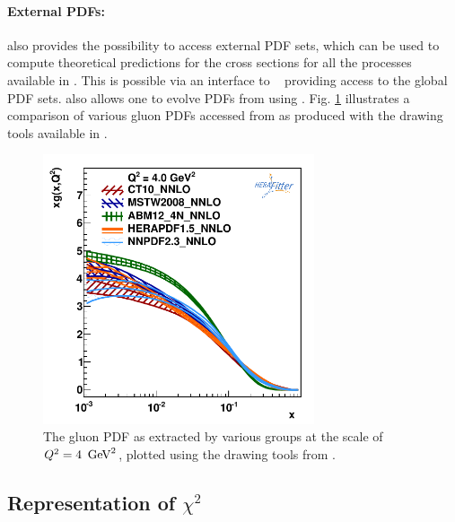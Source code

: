 \paragraph{External PDFs:} \rm 
 \fitter also provides the possibility to access external PDF sets, which can be used to compute 
theoretical predictions for the cross sections for all the processes available in \fitter. 
This is possible via an interface to \lhapdf~\cite{lhapdf,lhapdfweb} providing access to the 
global PDF sets.
\fitter also allows one to evolve PDFs from \lhapdf using \qcdnum.
Fig. \ref{fig:pdfs} illustrates a comparison of various gluon PDFs accessed from \lhapdf as produced with the drawing 
tools available in \fitter.
%
\begin{figure}[!ht]
   \centering
   \includegraphics[width=8cm]{pdfs.pdf}
   \caption{The gluon PDF as extracted by various groups at the scale of $Q^2=4 \ \,\text{Ge\hspace{-.08em}V}^2$, plotted using the drawing tools from \fitter.} 
 \label{fig:pdfs}
\end{figure}
%
\subsection{Representation of \texorpdfstring{$\chi^2$}{χ²}}
\label{sec:chi2representation}

